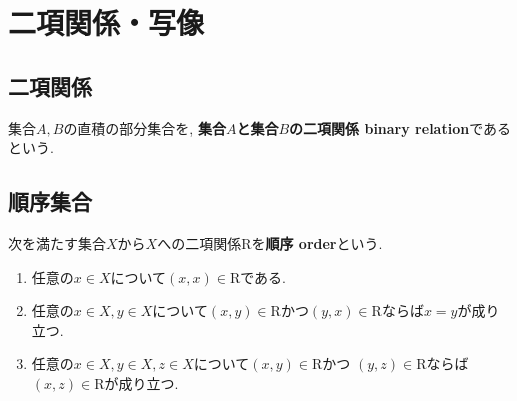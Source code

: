\section{二項関係・写像}
\subsection{二項関係}
\begin{Def}
集合$A,B$の直積の部分集合を, {\bf 集合$A$と集合$B$の二項関係 binary relation}であるという.
\end{Def}
\begin{comment}
\begin{Def}
集合$A,B$の二項関係$\mathrm{R}$に関して, 
とある$a\in A, b\in B$の組$(a,b)$が$R$の元であるとき,
{\bf $a$と$b$に間に$\mathrm{R}$の関係\index{かんけい@関係}がある}という.
\end{Def}
\begin{Notation}
$a$と$b$の間に$\mathrm{R}$の関係があることを$aRb$と表す.
\end{Notation}
\end{comment}
\subsection{順序集合}
\begin{Def}
次を満たす集合$X$から$X$への二項関係$\mathrm{R}$を{\bf 順序 order}という.
\begin{enumerate}
\item 任意の$x\in X$について$(x,x)\in \mathrm{R}$である.
\item 任意の$x\in X,y\in X$について$(x,y)\in \mathrm{R}$かつ$(y,x)\in \mathrm{R}$ならば$x=y$が成り立つ.
\item 任意の$x\in X,y\in X,z\in X$について$(x,y)\in \mathrm{R}$かつ $(y,z)\in \mathrm{R}$ならば
$(x,z)\in \mathrm{R}$が成り立つ.
\end{enumerate}
\end{Def}
\begin{comment}
\begin{Def}
順序をもつ集合を{\bf 順序集合 orderd set}という.
\end{Def}
\begin{Notation}
順序集合の元$x,y$に順序関係があるとき, $x\preceq y$で表す.
\end{Notation}
\end{comment}
